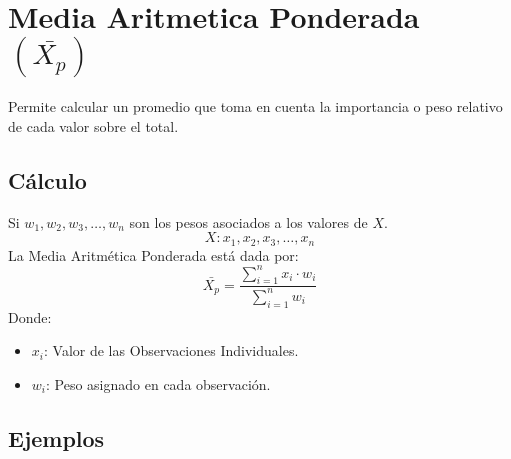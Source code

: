 \section{Media Aritmetica Ponderada $(\bar{X_p})$}
Permite calcular un promedio que toma en cuenta la importancia o peso relativo de cada valor sobre el total.
\subsection{Cálculo}
Si $w_1,w_2,w_3, \ldots ,w_n$ son los pesos asociados a los valores de $X$.
$$X:x_1,x_2,x_3,\ldots,x_n$$
La Media Aritmética Ponderada está dada por:
$$\bar{X_p}=\dfrac{\displaystyle\sum_{i=1}^{n}x_i\cdot w_i}{\displaystyle\sum_{i=1}^{n}w_i}$$
Donde:
\begin{itemize}
\item $x_i$: Valor de las Observaciones Individuales.
\item $w_i$: Peso asignado en cada observación.
\end{itemize}
\subsection{Ejemplos}